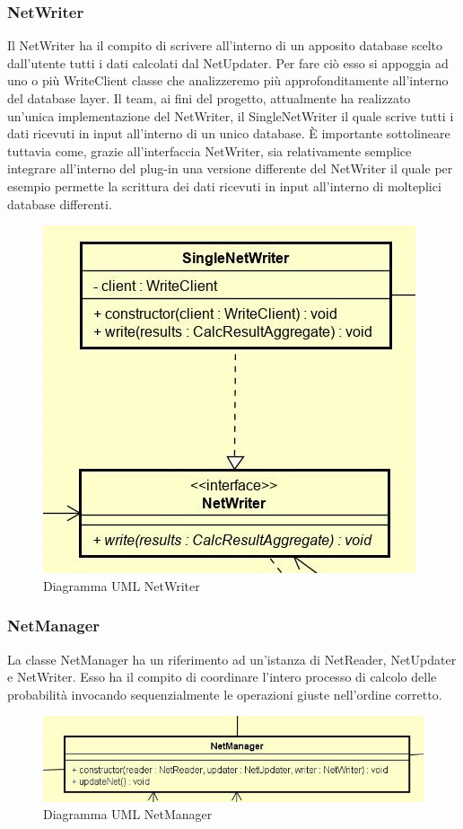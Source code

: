 \subsubsection{NetWriter}
Il NetWriter ha il compito di scrivere all'interno di un apposito database scelto dall'utente tutti i dati calcolati dal NetUpdater. Per fare ciò esso si appoggia ad uno o più WriteClient classe che analizzeremo più approfonditamente all'interno del database layer.
Il team, ai fini del progetto, attualmente ha realizzato un'unica implementazione del NetWriter, il SingleNetWriter il quale scrive tutti i dati ricevuti in input all'interno di un unico database. 
È importante sottolineare tuttavia come, grazie all'interfaccia NetWriter, sia relativamente semplice integrare all'interno del plug-in una versione differente del NetWriter il quale per esempio permette la scrittura dei dati ricevuti in input all'interno di molteplici database differenti.
\begin{figure} [H]
	\centering
	\includegraphics[scale=1]{Img/NetWriter}
	\caption{Diagramma UML NetWriter}\label{}
\end{figure}
\subsubsection{NetManager}
La classe NetManager ha un riferimento ad un'istanza di NetReader, NetUpdater e NetWriter. Esso ha il compito di coordinare l'intero processo di calcolo delle probabilità invocando sequenzialmente le operazioni giuste nell'ordine corretto.
\begin{figure} [H]
	\centering
	\includegraphics[scale=0.8]{Img/NetManager}
	\caption{Diagramma UML NetManager}\label{}
\end{figure}
